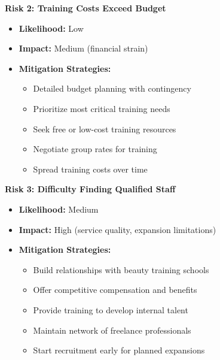 \documentclass[a4paper,12pt]{article}
\begin{document}
\textbf{Risk 2: Training Costs Exceed Budget}
\begin{itemize}[leftmargin=2em]
    \item \textbf{Likelihood:} Low
    \item \textbf{Impact:} Medium (financial strain)
    \item \textbf{Mitigation Strategies:}
    \begin{itemize}
        \item Detailed budget planning with contingency
        \item Prioritize most critical training needs
        \item Seek free or low-cost training resources
        \item Negotiate group rates for training
        \item Spread training costs over time
    \end{itemize}
\end{itemize}

\textbf{Risk 3: Difficulty Finding Qualified Staff}
\begin{itemize}[leftmargin=2em]
    \item \textbf{Likelihood:} Medium
    \item \textbf{Impact:} High (service quality, expansion limitations)
    \item \textbf{Mitigation Strategies:}
    \begin{itemize}
        \item Build relationships with beauty training schools
        \item Offer competitive compensation and benefits
        \item Provide training to develop internal talent
        \item Maintain network of freelance professionals
        \item Start recruitment early for planned expansions
    \end{itemize}
\end{itemize}
\end{document}
